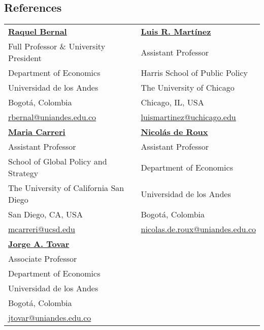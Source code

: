 \documentclass[margin,line]{res}
\begin{document}
\begin{resume}
\section{\sc References}

\begin{tabular}{p{7cm}p{7cm}}
   \href{https://sites.google.com/view/raquelbernal}{\textbf{Raquel Bernal}}                           & \href{https://sites.google.com/site/lrmartineza}{\textbf{Luis R. Martínez}}      \\
   Full Professor \& University President                & Assistant Professor            \\     
   Department of Economics                          & Harris School of Public Policy \\   
   Universidad de los Andes                         & The University of Chicago      \\
   Bogotá, Colombia                                 & Chicago, IL, USA               \\   
   \href{mailto:rbernal@uniandes.edu.co}{rbernal@uniandes.edu.co} &    \href{mailto:luismartinez@uchicago.edu}{luismartinez@uchicago.edu} \\
    \addlinespace
   \href{https://www.mariacarreri.com/}{\textbf{Maria Carreri}}                            &  \href{https://sites.google.com/site/nicoderoux/}{\textbf{Nicolás de Roux}}               \\
   Assistant Professor                               &   Assistant Professor                    \\     
   School of Global Policy and Strategy                          &  Department of Economics     \\   
   The University of California San Diego                        &  Universidad de los Andes   \\
   San Diego, CA, USA                                 &   Bogotá, Colombia                       \\      
   \href{mailto:mcarreri@ucsd.edu}{mcarreri@ucsd.edu} & \href{mailto:nicolas.de.roux@uniandes.edu.co}{nicolas.de.roux@uniandes.edu.co}   \\
   \addlinespace
   \href{https://sites.google.com/view/jorgetovar/home}{\textbf{Jorge A. Tovar}}                             &                \\
   Associate Professor                              &                      \\     
   Department of Economics                          &      \\   
   Universidad de los Andes                         &    \\
   Bogotá, Colombia                                 &                      \\      
   \href{mailto:jtovar@uniandes.edu.co}{jtovar@uniandes.edu.co} &  
\end{tabular}

\end{resume}
\end{document}
